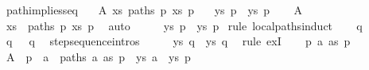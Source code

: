 \begin{isabellebody}
\isanewline
{}\isamarkupfalse%
\ path{\isacharunderscore}{\kern0pt}implies{\isacharunderscore}{\kern0pt}seq{\isacharcolon}{\kern0pt}\isanewline
\ \ \ A{}{\isacharcolon}{\kern0pt}\ {\isachardoublequoteopen}{\isasymexists}xs{\isachardot}{\kern0pt}\ paths\ p\ xs\ p{\isacharprime}{\kern0pt}{\isachardoublequoteclose}\isanewline
\ \ \ {\isachardoublequoteopen}{\isasymexists}ys{\isachardot}{\kern0pt}\ p\ {\isasymmapsto}{\isachardollar}{\kern0pt}\ ys\ p{\isacharprime}{\kern0pt}{\isachardoublequoteclose}\isanewline
%
\isadelimproof
%
\endisadelimproof
%
\isatagproof
{}\isamarkupfalse%
{\isacharminus}{\kern0pt}\isanewline
\ \ \isamarkupfalse%
\ A{}\ \isamarkupfalse%
\ xs\ \ {\isachardoublequoteopen}paths\ p\ xs\ p{\isacharprime}{\kern0pt}{\isachardoublequoteclose}\ \isamarkupfalse%
\ auto\isanewline
\ \ \isamarkupfalse%
\ \isamarkupfalse%
\ {\isachardoublequoteopen}{\isasymexists}ys{\isachardot}{\kern0pt}\ p\ {\isasymmapsto}{\isachardollar}{\kern0pt}\ ys\ p{\isacharprime}{\kern0pt}{\isachardoublequoteclose}\isanewline
{}\isamarkupfalse%
\ {\isacharparenleft}{\kern0pt}rule\ local{\isachardot}{\kern0pt}paths{\isachardot}{\kern0pt}induct{\isacharparenright}{\kern0pt}\isanewline
\ \ \isamarkupfalse%
\ q\isanewline
\ \ \isamarkupfalse%
\ {\isachardoublequoteopen}q\ {\isasymmapsto}{\isachardollar}{\kern0pt}\ {\isacharbrackleft}{\kern0pt}{\isacharbrackright}{\kern0pt}\ q{\isachardoublequoteclose}\ \isamarkupfalse%
\ step{\isacharunderscore}{\kern0pt}sequence{\isachardot}{\kern0pt}intros{\isacharparenleft}{\kern0pt}{}{\isacharparenright}{\kern0pt}\isacommand{{\isachardot}{\kern0pt}}\isamarkupfalse%
\isanewline
\ \ \isamarkupfalse%
\ \isamarkupfalse%
\ {\isachardoublequoteopen}{\isasymexists}ys{\isachardot}{\kern0pt}\ q\ {\isasymmapsto}{\isachardollar}{\kern0pt}\ ys\ q{\isachardoublequoteclose}\ \isamarkupfalse%
\ {\isacharparenleft}{\kern0pt}rule\ exI{\isacharparenright}{\kern0pt}\isanewline
{}\isamarkupfalse%
\isanewline
\ \ \isamarkupfalse%
\ p\ a\ as\ p{\isacharprime}{\kern0pt}{\isacharprime}{\kern0pt}\isanewline
\ \ \isamarkupfalse%
\ A{}{\isacharcolon}{\kern0pt}\ {\isachardoublequoteopen}{\isasymexists}{\isasymalpha}{\isachardot}{\kern0pt}\ p\ {\isasymmapsto}{\isasymalpha}\ a\ {\isasymand}\ paths\ a\ as\ p{\isacharprime}{\kern0pt}{\isacharprime}{\kern0pt}\ {\isasymand}\ {\isacharparenleft}{\kern0pt}{\isasymexists}ys{\isachardot}{\kern0pt}\ a\ {\isasymmapsto}{\isachardollar}{\kern0pt}\ ys\ p{\isacharprime}{\kern0pt}{\isacharprime}{\kern0pt}{\isacharparenright}{\kern0pt}{\isachardoublequoteclose}\isanewline

\end{isabellebody}
